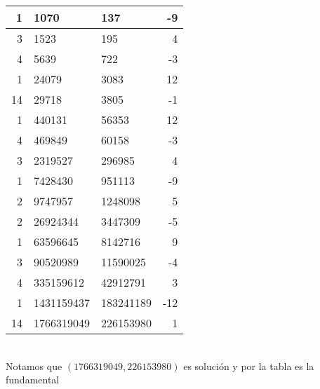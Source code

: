 \begin{sol}
\begin{enumerate}[label = (\roman*)]
\begin{tabular}{| r | l | l | r |}
			      1     & 1070       & 137       & -9   \\
			      \hline
			      3     & 1523       & 195       & 4    \\
			      \hline
			      4     & 5639       & 722       & -3   \\
			      \hline
			      1     & 24079      & 3083      & 12   \\
			      \hline
			      14    & 29718      & 3805      & -1   \\
			      \hline
			      1     & 440131     & 56353     & 12   \\
			      \hline
			      4     & 469849     & 60158     & -3   \\
			      \hline
			      3     & 2319527    & 296985    & 4    \\
			      \hline
			      1     & 7428430    & 951113    & -9   \\
			      \hline
			      2     & 9747957    & 1248098   & 5    \\
			      \hline
			      2     & 26924344   & 3447309   & -5   \\
			      \hline
			      1     & 63596645   & 8142716   & 9    \\
			      \hline
			      3     & 90520989   & 11590025  & -4   \\
			      \hline
			      4     & 335159612  & 42912791  & 3    \\
			      \hline
			      1     & 1431159437 & 183241189 & -12  \\
			      \hline
			      14    & 1766319049 & 226153980 & 1    \\
			      \hline
		      \end{tabular}\\
			  Notamos que $(1766319049,226153980)$ es solución y por la tabla es la fundamental
			  \newpage


\end{enumerate}
\end{sol}
